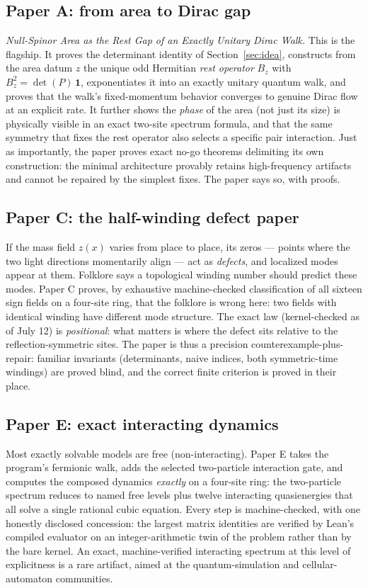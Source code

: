 \documentclass[11pt]{article}
\begin{document}
\subsection{Paper A: from area to Dirac gap}

\emph{Null-Spinor Area as the Rest Gap of an Exactly Unitary Dirac Walk.}
This is the flagship.  It proves the determinant identity of
Section~\ref{sec:idea}, constructs from the area datum $z$ the unique
odd Hermitian \emph{rest operator} $B_z$ with $B_z^2 = \det(P)\,\mathbf 1$,
exponentiates it into an exactly unitary quantum walk, and proves that the
walk's fixed-momentum behavior converges to genuine Dirac flow at an
explicit rate.  It further shows the \emph{phase} of the area (not just
its size) is physically visible in an exact two-site spectrum formula, and
that the same symmetry that fixes the rest operator also selects a
specific pair interaction.  Just as importantly, the paper proves exact
no-go theorems delimiting its own construction: the minimal architecture
provably retains high-frequency artifacts and cannot be repaired by the
simplest fixes.  The paper says so, with proofs.

\subsection{Paper C: the half-winding defect paper}

If the mass field $z(x)$ varies from place to place, its zeros ---
points where the two light directions momentarily align --- act as
\emph{defects}, and localized modes appear at them.  Folklore says a
topological winding number should predict these modes.  Paper C proves,
by exhaustive machine-checked classification of all sixteen sign fields
on a four-site ring, that the folklore is wrong here: two fields with
identical winding have different mode structure.  The exact law
(kernel-checked as of July 12) is \emph{positional}: what matters is
where the defect sits relative to the reflection-symmetric sites.  The
paper is thus a precision counterexample-plus-repair: familiar invariants
(determinants, naive indices, both symmetric-time windings) are proved
blind, and the correct finite criterion is proved in their place.

\subsection{Paper E: exact interacting dynamics}

Most exactly solvable models are free (non-interacting).  Paper E takes
the program's fermionic walk, adds the selected two-particle interaction
gate, and computes the composed dynamics \emph{exactly} on a four-site
ring: the two-particle spectrum reduces to named free levels plus twelve
interacting quasienergies that all solve a single rational cubic
equation.  Every step is machine-checked, with one honestly disclosed
concession: the largest matrix identities are verified by Lean's compiled
evaluator on an integer-arithmetic twin of the problem rather than by the
bare kernel.  An exact, machine-verified interacting spectrum at this
level of explicitness is a rare artifact, aimed at the quantum-simulation
and cellular-automaton communities.
\end{document}
